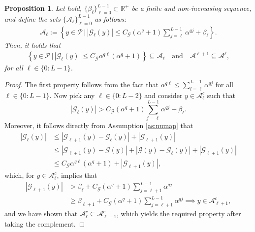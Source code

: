 \documentclass[10pt,a4paper]{amsart}
\newtheorem{proposition}{Proposition}
\newcommand{\IR}{\mathbb{R}}
\newcommand{\abs}[1]{{\left\vert #1 \right\vert}}
\newcommand{\cA}{\mathcal{A}}
\newcommand{\cG}{\mathcal{G}}
\newcommand{\cP}{\mathcal{P}}
\begin{document}
\begin{proposition}
  \label{prop:setdefi}
  Let  hold, $\{\beta_\ell\}_{\ell=0}^{L-1}\subset\IR^+$ be a finite and non-increasing sequence, and
  define the sets $\{\cA_\ell\}_{\ell=0}^{L-1}$ as follows:
  \begin{align*}
    \cA_\ell:=\left\lbrace y\in\cP\,\Bigg\vert\,\abs{\cG_\ell(y)}\leq C_\cG(\alpha^q+1)\sum\limits_{j=\ell}^{L-1}\alpha^{q j}+\beta_\ell\right\rbrace.
  \end{align*}
  Then, it holds that
  \begin{align*}
    \left\{y\in\cP\,\vert\,\abs{\cG_\ell(y)}\leq C_\cG\alpha^{q\ell}(\alpha^q+1)\right\}\subseteq\cA_\ell\quad\text{and}\quad\cA^{\ell+1}\subseteq\cA^{\ell},
  \end{align*}
  for all $\ell\in\{0:L-1\}$.
\end{proposition}

\begin{proof}
  The first property follows from the fact that $\alpha^{q\ell}\leq\sum_{l=\ell}^{L-1}\alpha^{qj}$ for all $\ell\in\{0:L-1\}$.
  Now pick any $\ell\in\{0:L-2\}$ and consider $y\in\cA_\ell^c$ such that $$\abs{\cG_{\ell}(y)}>C_\cG(\alpha^q+1)\sum_{j=\ell}^{L-1}\alpha^{qj}+\beta_\ell.$$
  Moreover, it follows directly from Assumption \ref{as:numap} that
  \begin{align*}
    \abs{\cG_{\ell}(y)}
    &\leq\abs{\cG_{\ell+1}(y)-\cG_{\ell}(y)}+\abs{\cG_{\ell+1}(y)}\\
    &\leq\abs{\cG_{\ell+1}(y)-\cG(y)}+\abs{\cG(y)-\cG_{\ell}(y)}+\abs{\cG_{\ell+1}(y)}\\
    &\leq C_\cG\alpha^{q\ell}(\alpha^{q}+1)+\abs{\cG_{\ell+1}(y)},
  \end{align*}
  which, for $y \in \mathcal{A}_\ell^c$, implies that
  \begin{align*}
    \abs{\cG_{\ell+1}(y)} &> \beta_{\ell} + C_\cG(\alpha^q+1)\sum\limits_{j=\ell+1}^{L-1}\alpha^{qj}\\
                          &\geq \beta_{\ell+1} + C_\cG(\alpha^q+1)\sum\limits_{j=\ell+1}^{L-1}\alpha^{qj}\implies y\in\cA_{\ell+1}^c,
  \end{align*}
  and we have shown that $\cA_{\ell}^c\subseteq\cA_{\ell+1}^c$, which yields the required property after taking
  the complement.
\end{proof}
\end{document}
